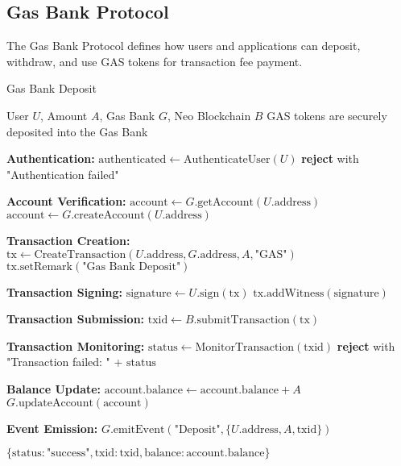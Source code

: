 \subsection{Gas Bank Protocol}
\label{subsec:gas-bank-protocol}

The Gas Bank Protocol defines how users and applications can deposit, withdraw, and use GAS tokens for transaction fee payment.

\begin{tcolorbox}[
    enhanced,
    colback=blue!5!white,
    colframe=blue!75!black,
    arc=5mm,
    boxrule=1.5pt,
    title=Gas Bank Deposit Protocol,
    fonttitle=\bfseries,
    coltitle=white,
    attach boxed title to top left={yshift=-2mm, xshift=5mm},
    boxed title style={colback=blue!75!black, rounded corners},
    shadow={2mm}{-2mm}{0mm}{black!50},
    drop fuzzy shadow
]
\begin{protocol}{Gas Bank Deposit}
\label{prot:gas-bank-deposit}
\begin{algorithmic}[1]
\Require User $U$, Amount $A$, Gas Bank $G$, Neo Blockchain $B$
\Ensure GAS tokens are securely deposited into the Gas Bank

\State \textbf{Authentication:}
\State $\text{authenticated} \gets \text{AuthenticateUser}(U)$
    \State \textbf{reject} with "Authentication failed"
\EndIf

\State \textbf{Account Verification:}
\State $\text{account} \gets G.\text{getAccount}(U.\text{address})$
    \State $\text{account} \gets G.\text{createAccount}(U.\text{address})$
\EndIf

\State \textbf{Transaction Creation:}
\State $\text{tx} \gets \text{CreateTransaction}(U.\text{address}, G.\text{address}, A, \text{"GAS"})$
\State $\text{tx}.\text{setRemark}(\text{"Gas Bank Deposit"})$

\State \textbf{Transaction Signing:}
\State $\text{signature} \gets U.\text{sign}(\text{tx})$
\State $\text{tx}.\text{addWitness}(\text{signature})$

\State \textbf{Transaction Submission:}
\State $\text{txid} \gets B.\text{submitTransaction}(\text{tx})$

\State \textbf{Transaction Monitoring:}
\State $\text{status} \gets \text{MonitorTransaction}(\text{txid})$
    \State \textbf{reject} with "Transaction failed: " + $\text{status}$
\EndIf

\State \textbf{Balance Update:}
\State $\text{account}.\text{balance} \gets \text{account}.\text{balance} + A$
\State $G.\text{updateAccount}(\text{account})$

\State \textbf{Event Emission:}
\State $G.\text{emitEvent}(\text{"Deposit"}, \{U.\text{address}, A, \text{txid}\})$

\State \Return $\{\text{status}: \text{"success"}, \text{txid}: \text{txid}, \text{balance}: \text{account}.\text{balance}\}$
\end{algorithmic}
\end{protocol}
\end{tcolorbox}

